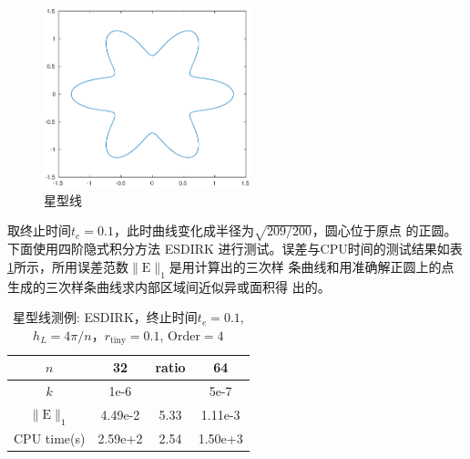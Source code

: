 \documentclass[a4paper,twoside]{ctexart}
\begin{document}
\begin{figure}[!htp]                                                                       
  \centering                                                                           
  \includegraphics[width=6cm]{star.eps}                                           
  \caption{星型线}                        
\end{figure}

取终止时间$t_e=0.1$，此时曲线变化成半径为$\sqrt{209/200}$，圆心位于原点
的正圆。
\newpage
下面使用四阶隐式积分方法 ESDIRK 进行测试。误差与CPU时间的测试结果如表
\ref{tab:star1}所示，所用误差范数$\|\mathrm{E}\|_1$是用计算出的三次样
条曲线和用准确解正圆上的点生成的三次样条曲线求内部区域间近似异或面积得
出的。
\begin{table}[htbp]
    \centering\begin{tabular}{c|ccc}
        \hline
         $n$&32&ratio&64\\
                \hline
         $k$&1e-6&&5e-7\\
        \hline
        $\|\mathrm{E}\|_1$&4.49e-2&5.33&1.11e-3\\
        \hline
        CPU time(s)&2.59e+2&2.54&1.50e+3\\
        \hline
      \end{tabular}
    \caption{星型线测例: ESDIRK，终止时间$t_e = 0.1$, $h_L=4\pi/n$，$r_{\text{tiny}}=0.1$,
      $\text{Order} = 4$}
    \label{tab:star1}
  \end{table}\\
  
\end{document}
